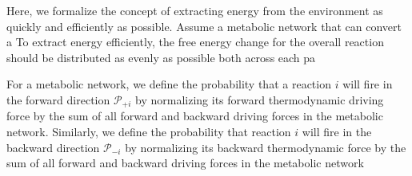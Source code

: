 Here, we formalize the concept of extracting energy from the environment as quickly and efficiently as possible. Assume a metabolic network that can convert a To extract energy efficiently, the free energy change for the overall reaction should be distributed as evenly as possible both across each pa


For a metabolic network, we define the probability that a reaction $i$ will fire in the forward  direction ${\mathcal P_{+i}}$ by normalizing its forward thermodynamic driving force by the sum of all forward and backward driving forces in the metabolic network. Similarly, we define the probability that reaction $i$ will fire in the backward direction $\mathcal P_{-i}$ by normalizing its backward thermodynamic force by  the sum of all forward and backward driving forces in the metabolic network
